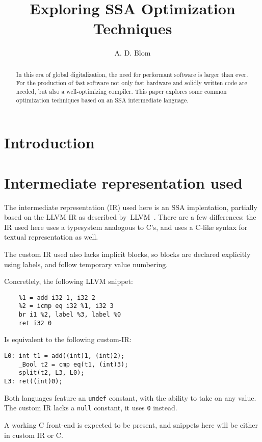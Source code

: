 \documentclass[12pt, a4paper]{article}
\title{Exploring SSA Optimization Techniques}
\author{A. D. Blom}
\date{}
\begin{document}
  \maketitle
  \begin{abstract}
In this era of global digitalization, the need for performant software is larger
than ever. For the production of fast software not only 
fast hardware and solidly written code are needed, but also a well-optimizing 
compiler. This paper explores some common optimization techniques based on an 
SSA intermediate language.
  \end{abstract}

  \section{Introduction}


  \section{Intermediate representation used}
The intermediate representation (IR) used here is an SSA implentation, 
partially based on the LLVM IR as described by~LLVM~\cite{llvm_ir}.
There are a few differences: the IR used here  uses a typesystem analogous to
C's, and uses a C-like syntax for textual 
representation as well.

The custom IR used also lacks implicit blocks, so blocks are declared 
explicitly using labels, and follow temporary value numbering.

Concretlely, the following LLVM snippet:

\begin{lstlisting}
	%1 = add i32 1, i32 2
	%2 = icmp eq i32 %1, i32 3
	br i1 %2, label %3, label %0
	ret i32 0
\end{lstlisting}

Is equivalent to the following custom-IR:

\begin{lstlisting}
L0:	int t1 = add((int)1, (int)2);
	_Bool t2 = cmp eq(t1, (int)3);
	split(t2, L3, L0);
L3:	ret((int)0);
\end{lstlisting}

Both languages feature an \verb+undef+ constant, with the ability to take on any
value. The custom IR lacks a \verb+null+ constant, it uses \verb+0+ instead.

A working C front-end is expected to be present, and snippets here will be 
either in custom IR or C.
\end{document}
